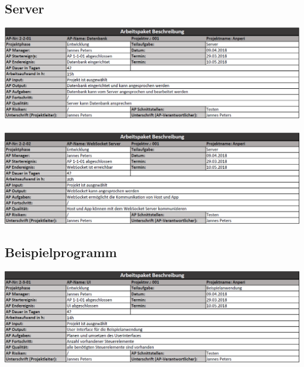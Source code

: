 \documentclass{scrartcl}
\begin{document}
\subsection{Server}
\includegraphics[scale=0.6]{ArbeitsPakete/AP2-2-01.png}
\\
\\
\includegraphics[scale=0.6]{ArbeitsPakete/AP2-2-02.png}
\subsection{Beispielprogramm}
\includegraphics[scale=0.6]{ArbeitsPakete/AP2-3-01.png}
\end{document}
